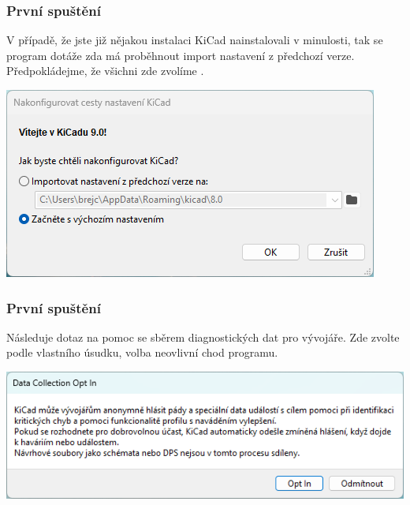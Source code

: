 \documentclass{beamer}
\begin{document}
	\begin{frame}
    \frametitle{První spuštění}
    \small
    V případě, že jste již nějakou instalaci KiCad nainstalovali v minulosti, tak se program dotáže zda má proběhnout import nastavení z předchozí verze. Předpokládejme, že všichni zde zvolíme .
		
    \begin{center}
			\includegraphics[scale=0.5]{obr/kicad_pocatecni_spusteni.png}
		\end{center}
	\end{frame}
	\begin{frame}
    \frametitle{První spuštění}
    \small
    Následuje dotaz na pomoc se sběrem diagnostických dat pro vývojáře. Zde zvolte podle vlastního úsudku, volba neovlivní chod programu.
		
    \begin{center}
			\includegraphics[scale=0.5]{obr/kicad_pocatecni_spusteni2.png}
		\end{center}
	\end{frame}
\end{document}
